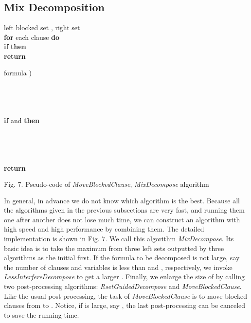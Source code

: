 \documentclass{llncs}
\begin{document}
\subsection{Mix Decomposition}

\begin{flushleft}
\begin{sf}
\begin{footnotesize}
\hskip 22mm left blocked set , right set \\
\hskip 26mm {\bf for } each clause  {\bf do}\\
\hskip 30mm    {\bf if }  {\bf then} \\
\hskip 26mm {\bf return} 

\vspace{1em}

\hskip 12mm formula )\\
\hskip 16mm \\
\hskip 16mm \\
\hskip 16mm \\
\hskip 16mm \\
\hskip 16mm  {\bf if }  and  {\bf then} \\
\hskip 20mm    \\
\hskip 20mm    \\
\hskip 16mm \\
\hskip 16mm \\
\hskip 16mm {\bf return} 

\vspace{1em}

\hskip 8mm \textrm{Fig. 7. Pseudo-code of \emph{MoveBlockedClause},
\emph{MixDecompose} algorithm}
\end{footnotesize}
\end{sf}
\end{flushleft}


In general, in advance we do not know which algorithm is the best.
Because all the algorithms given in the previous subsections are
very fast, and running them one after another does not lose much
time, we can construct an algorithm with high speed and high
performance by combining them. The detailed implementation is shown
in Fig. 7. We call this algorithm \emph{MixDecompose}. Its basic
idea is to take the maximum from three left sets outputted by three
algorithms as the initial  first. If the formula to be decomposed
is not large, say the number of clauses and variables is less than
 and , respectively, we invoke
\emph{LessInterfereDecompose} to get a larger . Finally, we
enlarge the size of  by calling two post-processing algorithms:
\emph{RsetGuidedDecompose} and \emph{MoveBlockedClause}. Like the
usual post-processing, the task of \emph{MoveBlockedClause} is to
move blocked clauses from  to . Notice, if  is large, say
, the last post-processing can be canceled to save the
running time.
\end{document}
